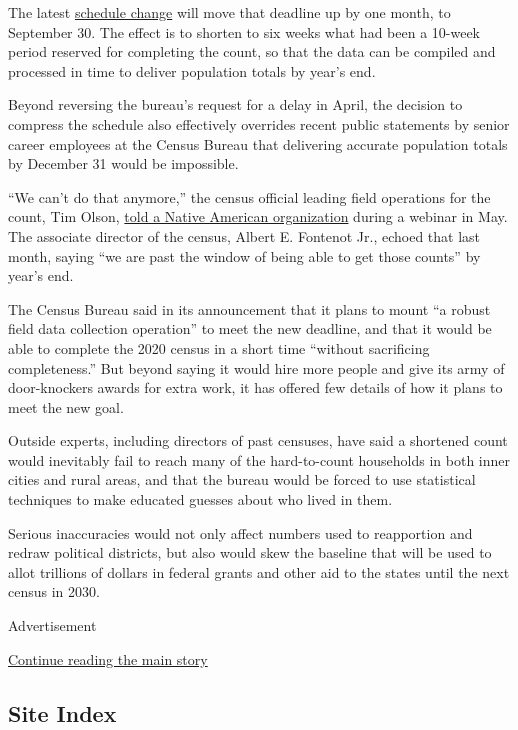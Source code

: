 The latest
\href{https://www.nytimes.com/2020/07/28/us/trump-census.html}{schedule
change} will move that deadline up by one month, to September 30. The
effect is to shorten to six weeks what had been a 10-week period
reserved for completing the count, so that the data can be compiled and
processed in time to deliver population totals by year's end.

Beyond reversing the bureau's request for a delay in April, the decision
to compress the schedule also effectively overrides recent public
statements by senior career employees at the Census Bureau that
delivering accurate population totals by December 31 would be
impossible.

``We can't do that anymore,'' the census official leading field
operations for the count, Tim Olson,
\href{https://www.youtube.com/watch?v=F6IyJMtDDgY\&feature=youtu.be\&t=4688}{told
a Native American organization} during a webinar in May. The associate
director of the census, Albert E. Fontenot Jr., echoed that last month,
saying ``we are past the window of being able to get those counts'' by
year's end.

The Census Bureau said in its announcement that it plans to mount ``a
robust field data collection operation'' to meet the new deadline, and
that it would be able to complete the 2020 census in a short time
``without sacrificing completeness.'' But beyond saying it would hire
more people and give its army of door-knockers awards for extra work, it
has offered few details of how it plans to meet the new goal.

Outside experts, including directors of past censuses, have said a
shortened count would inevitably fail to reach many of the hard-to-count
households in both inner cities and rural areas, and that the bureau
would be forced to use statistical techniques to make educated guesses
about who lived in them.

Serious inaccuracies would not only affect numbers used to reapportion
and redraw political districts, but also would skew the baseline that
will be used to allot trillions of dollars in federal grants and other
aid to the states until the next census in 2030.

Advertisement

\protect\hyperlink{after-bottom}{Continue reading the main story}

\hypertarget{site-index}{%
\subsection{Site Index}\label{site-index}}

